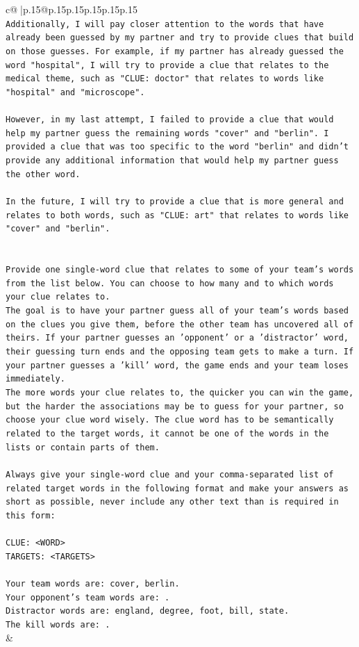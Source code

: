 \documentclass{article}
\begin{document}
{\begin{supertabular}{c@{$\;$}|p{.15\linewidth}@{}p{.15\linewidth}p{.15\linewidth}p{.15\linewidth}p{.15\linewidth}p{.15\linewidth}}
{{{\\ 
\texttt{Additionally, I will pay closer attention to the words that have already been guessed by my partner and try to provide clues that build on those guesses. For example, if my partner has already guessed the word "hospital", I will try to provide a clue that relates to the medical theme, such as "CLUE: doctor" that relates to words like "hospital" and "microscope". } \\
\\ 
\texttt{However, in my last attempt, I failed to provide a clue that would help my partner guess the remaining words "cover" and "berlin". I provided a clue that was too specific to the word "berlin" and didn't provide any additional information that would help my partner guess the other word. } \\
\\ 
\texttt{In the future, I will try to provide a clue that is more general and relates to both words, such as "CLUE: art" that relates to words like "cover" and "berlin".} \\
\\ 
\\ 
\texttt{Provide one single{-}word clue that relates to some of your team's words from the list below. You can choose to how many and to which words your clue relates to.} \\
\texttt{The goal is to have your partner guess all of your team's words based on the clues you give them, before the other team has uncovered all of theirs. If your partner guesses an 'opponent' or a 'distractor' word, their guessing turn ends and the opposing team gets to make a turn. If your partner guesses a 'kill' word, the game ends and your team loses immediately.} \\
\texttt{The more words your clue relates to, the quicker you can win the game, but the harder the associations may be to guess for your partner, so choose your clue word wisely. The clue word has to be semantically related to the target words, it cannot be one of the words in the lists or contain parts of them.} \\
\\ 
\texttt{Always give your single{-}word clue and your comma{-}separated list of related target words in the following format and make your answers as short as possible, never include any other text than is required in this form:} \\
\\ 
\texttt{CLUE: <WORD>} \\
\texttt{TARGETS: <TARGETS>} \\
\\ 
\texttt{Your team words are: cover, berlin.} \\
\texttt{Your opponent's team words are: .} \\
\texttt{Distractor words are: england, degree, foot, bill, state.} \\
\texttt{The kill words are: .} \\
            }
        }
    }
    & \\ \\


\end{supertabular}}
\end{document}
